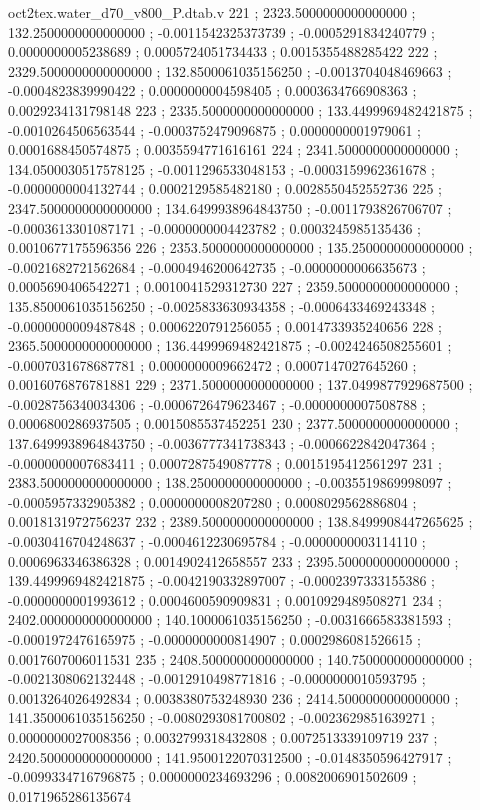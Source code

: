 \begin{filecontents}[overwrite]{oct2tex.water_d70_v800_P.dtab.v}
221 ; 2323.5000000000000000 ; 132.2500000000000000 ; -0.0011542325373739 ; -0.0005291834240779 ; 0.0000000005238689 ; 0.0005724051734433 ; 0.0015355488285422
222 ; 2329.5000000000000000 ; 132.8500061035156250 ; -0.0013704048469663 ; -0.0004823839990422 ; 0.0000000004598405 ; 0.0003634766908363 ; 0.0029234131798148
223 ; 2335.5000000000000000 ; 133.4499969482421875 ; -0.0010264506563544 ; -0.0003752479096875 ; 0.0000000001979061 ; 0.0001688450574875 ; 0.0035594771616161
224 ; 2341.5000000000000000 ; 134.0500030517578125 ; -0.0011296533048153 ; -0.0003159962361678 ; -0.0000000004132744 ; 0.0002129585482180 ; 0.0028550452552736
225 ; 2347.5000000000000000 ; 134.6499938964843750 ; -0.0011793826706707 ; -0.0003613301087171 ; -0.0000000004423782 ; 0.0003245985135436 ; 0.0010677175596356
226 ; 2353.5000000000000000 ; 135.2500000000000000 ; -0.0021682721562684 ; -0.0004946200642735 ; -0.0000000006635673 ; 0.0005690406542271 ; 0.0010041529312730
227 ; 2359.5000000000000000 ; 135.8500061035156250 ; -0.0025833630934358 ; -0.0006433469243348 ; -0.0000000009487848 ; 0.0006220791256055 ; 0.0014733935240656
228 ; 2365.5000000000000000 ; 136.4499969482421875 ; -0.0024246508255601 ; -0.0007031678687781 ; 0.0000000009662472 ; 0.0007147027645260 ; 0.0016076876781881
229 ; 2371.5000000000000000 ; 137.0499877929687500 ; -0.0028756340034306 ; -0.0006726479623467 ; -0.0000000007508788 ; 0.0006800286937505 ; 0.0015085537452251
230 ; 2377.5000000000000000 ; 137.6499938964843750 ; -0.0036777341738343 ; -0.0006622842047364 ; -0.0000000007683411 ; 0.0007287549087778 ; 0.0015195412561297
231 ; 2383.5000000000000000 ; 138.2500000000000000 ; -0.0035519869998097 ; -0.0005957332905382 ; 0.0000000008207280 ; 0.0008029562886804 ; 0.0018131972756237
232 ; 2389.5000000000000000 ; 138.8499908447265625 ; -0.0030416704248637 ; -0.0004612230695784 ; -0.0000000003114110 ; 0.0006963346386328 ; 0.0014902412658557
233 ; 2395.5000000000000000 ; 139.4499969482421875 ; -0.0042190332897007 ; -0.0002397333155386 ; -0.0000000001993612 ; 0.0004600590909831 ; 0.0010929489508271
234 ; 2402.0000000000000000 ; 140.1000061035156250 ; -0.0031666583381593 ; -0.0001972476165975 ; -0.0000000000814907 ; 0.0002986081526615 ; 0.0017607006011531
235 ; 2408.5000000000000000 ; 140.7500000000000000 ; -0.0021308062132448 ; -0.0012910498771816 ; -0.0000000010593795 ; 0.0013264026492834 ; 0.0038380753248930
236 ; 2414.5000000000000000 ; 141.3500061035156250 ; -0.0080293081700802 ; -0.0023629851639271 ; 0.0000000027008356 ; 0.0032799318432808 ; 0.0072513339109719
237 ; 2420.5000000000000000 ; 141.9500122070312500 ; -0.0148350596427917 ; -0.0099334716796875 ; 0.0000000234693296 ; 0.0082006901502609 ; 0.0171965286135674

\end{filecontents}
